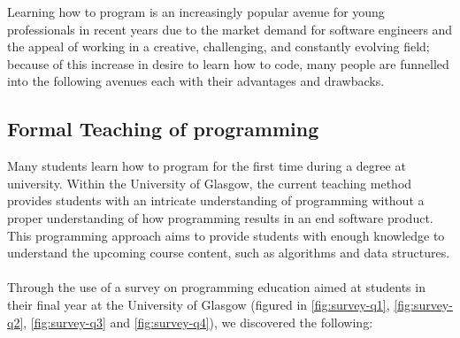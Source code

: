 \documentclass{l4proj}
\begin{document}
Learning how to program is an increasingly popular avenue for young professionals in recent years due to the market demand for software engineers and the appeal of working in a creative, challenging, and constantly evolving field; because of this increase in desire to learn how to code, many people are funnelled into the following avenues each with their advantages and drawbacks.

\subsection{Formal Teaching of programming}
Many students learn how to program for the first time during a degree at university. Within the University of Glasgow, the current teaching method provides students with an intricate understanding of programming without a proper understanding of how programming results in an end software product. This programming approach aims to provide students with enough knowledge to understand the upcoming course content, such as algorithms and data structures.
\\ \\
Through the use of a survey on programming education aimed at students in their final year at the University of Glasgow (figured in \ref{fig:survey-q1}, \ref{fig:survey-q2}, \ref{fig:survey-q3} and \ref{fig:survey-q4}), we discovered the following:
\end{document}
